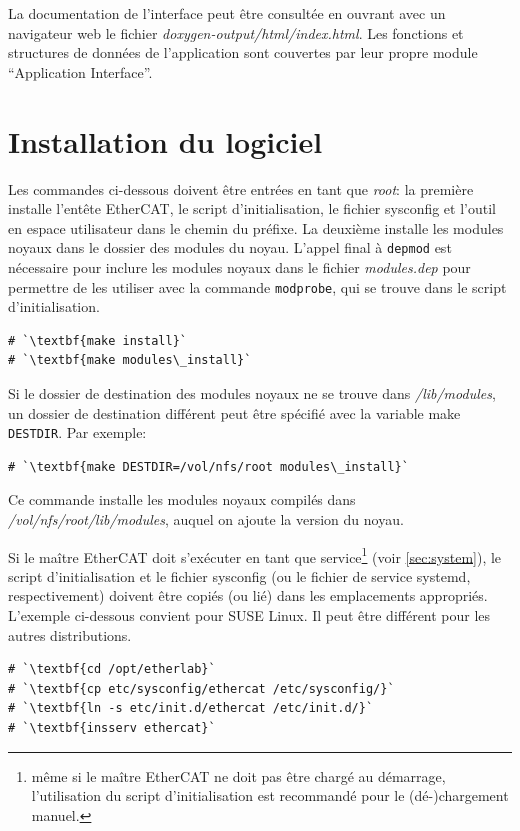 \documentclass[a4paper,12pt,BCOR6mm,bibtotoc,idxtotoc]{scrbook}
\begin{document}
La documentation de l'interface peut \^etre consult\'ee en ouvrant avec
un navigateur web le fichier \textit{doxygen-output/html/index.html}.
Les fonctions et structures de donn\'ees de l'application sont couvertes
par leur propre module ``Application Interface''.

\section{Installation du logiciel}

Les commandes ci-dessous doivent \^etre entr\'ees en tant que
\textit{root}: la premi\`ere installe l'ent\^ete EtherCAT, le script
d'initialisation, le fichier sysconfig et l'outil en espace
utilisateur dans le chemin du pr\'efixe.  La deuxi\`eme installe les
modules noyaux dans le dossier des modules du noyau.  L'appel final
\`a \lstinline+depmod+ est n\'ecessaire pour inclure les modules
noyaux dans le fichier \textit{modules.dep} pour permettre de les
utiliser avec la commande \lstinline+modprobe+, qui se trouve dans le
script d'initialisation.

\begin{lstlisting}
# `\textbf{make install}`
# `\textbf{make modules\_install}`
\end{lstlisting}

Si le dossier de destination des modules noyaux ne se trouve dans
\textit{/lib/modules}, un dossier de destination diff\'erent peut \^etre
sp\'ecifi\'e avec la variable make \lstinline+DESTDIR+. Par exemple:

\begin{lstlisting}
# `\textbf{make DESTDIR=/vol/nfs/root modules\_install}`
\end{lstlisting}

Ce commande installe les modules noyaux compil\'es dans
\textit{/vol/nfs/root/lib/modules}, auquel on ajoute la version du
noyau.

Si le ma\^itre EtherCAT doit s'ex\'ecuter en tant que
service\footnote{ m\^eme si le ma\^itre EtherCAT ne doit pas \^etre
  charg\'e au d\'emarrage, l'utilisation du script d'initialisation
  est recommand\'e pour le (d\'e-)chargement manuel.} (voir
\autoref{sec:system}), le script d'initialisation et le fichier
sysconfig (ou le fichier de service systemd, respectivement) doivent
\^etre copi\'es (ou li\'e) dans les emplacements appropri\'es.
L'exemple ci-dessous convient pour SUSE Linux.  Il peut \^etre
diff\'erent pour les autres distributions.

\begin{lstlisting}
# `\textbf{cd /opt/etherlab}`
# `\textbf{cp etc/sysconfig/ethercat /etc/sysconfig/}`
# `\textbf{ln -s etc/init.d/ethercat /etc/init.d/}`
# `\textbf{insserv ethercat}`
\end{lstlisting}
\end{document}
